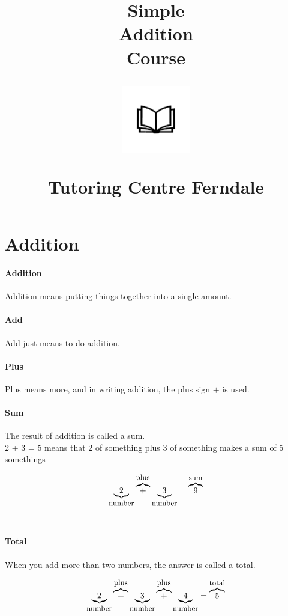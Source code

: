 \documentclass{article}
\author{}
\date{}
\title{Simple\\Addition\\Course\\
\begin{center}
\includegraphics[width=4em]{ApS_logo.png}
\end{center}
\begin{normalsize}Tutoring Centre Ferndale\end{normalsize}}
\begin{document}
\maketitle

\section*{Addition}

\paragraph{Addition}
Addition means putting things together into a single amount.\\

\paragraph{Add}
Add just means to do addition.

\paragraph{Plus}
Plus means more, and in writing addition, the plus sign $+$ is used.

\paragraph{Sum}
The result of addition is called a sum.\\

2 + 3 = 5 means that 2 of something  plus 3 of something  
makes a sum of 5 somethings 

{\Large $$\underbrace{2}_{\textrm{\small{number}}} \overbrace{+}^{\textrm{\small{plus}}} \underbrace{3}_{\textrm{\small{number}}} = \overbrace{9}^{\textrm{\small{sum}}}$$}\\

\paragraph{Total}
When you add more than two numbers, the answer is called a total.

{\Large $$\underbrace{2}_{\textrm{\small{number}}} \overbrace{+}^{\textrm{\small{plus}}} \underbrace{3}_{\textrm{\small{number}}}  \overbrace{+}^{\textrm{\small{plus}}} \underbrace{4}_{\textrm{\small{number}}} = \overbrace{5}^{\textrm{\small{total}}}$$}
\end{document}

